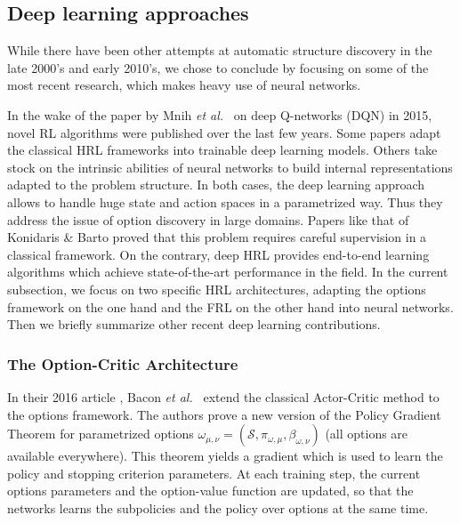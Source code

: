 \documentclass{article}
\newcommand{\etal}{\textit{et al.}}
\begin{document}
\subsection{Deep learning approaches}

While there have been other attempts at automatic structure discovery in the late 2000's and early 2010's, we chose to conclude by focusing on some of the most recent research, which makes heavy use of neural networks.

In the wake of the paper by Mnih \etal~\cite{mnih_human-level_2015} on deep Q-networks (DQN) in 2015, novel RL algorithms \cite{kulkarni_hierarchical_2016, alexander_strategic_2016, bacon_option-critic_2016, florensa_stochastic_2017, casanueva_feudal_2018} were published over the last few years. Some papers adapt the classical HRL frameworks into trainable deep learning models. Others take stock on the intrinsic abilities of neural networks to build internal representations adapted to the problem structure. In both cases, the deep learning approach allows to handle huge state and action spaces in a parametrized way. Thus they address the issue of option discovery in large domains. Papers like that of Konidaris \& Barto \cite{konidaris_skill_2009} proved that this problem requires careful supervision in a classical framework. On the contrary, deep HRL provides end-to-end learning algorithms which achieve state-of-the-art performance in the field. In the current subsection, we focus on two specific HRL architectures, adapting the options framework on the one hand and the FRL on the other hand into neural networks. Then we briefly summarize other recent deep learning contributions.

\subsubsection{The Option-Critic Architecture}

In their 2016 article \cite{bacon_option-critic_2016}, Bacon \etal~ extend the classical Actor-Critic method to the options framework. The authors prove a new version of the Policy Gradient Theorem for parametrized options $\omega_{\mu, \nu} = (\mathcal{S}, \pi_{\omega, \mu}, \beta_{\omega, \nu})$ (all options are available everywhere). This theorem yields a gradient which is used to learn the policy and stopping criterion parameters. At each training step, the current options parameters and the option-value function are updated, so that the networks learns the subpolicies and the policy over options at the same time.
\end{document}
